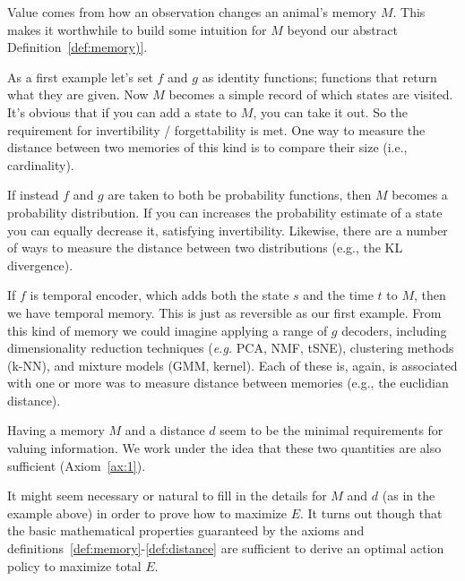 \documentclass[9pt,twocolumn,twoside]{pnas-new}
\begin{document}

Value comes from how an observation changes an animal's memory $M$. This makes it worthwhile to build some intuition for $M$ beyond our abstract Definition~\ref{def:memory)}. 

As a first example let's set $f$ and $g$ as identity functions; functions that return what they are given. Now $M$ becomes a simple record of which states are visited. It's obvious that if you can add a state to $M$, you can take it out. So the requirement for invertibility / forgettability is met. One way to measure the distance between two memories of this kind is to compare their size (i.e., cardinality).

If instead $f$ and $g$ are taken to both be probability functions, then $M$ becomes a probability distribution. If you can increases the probability estimate of a state you can equally decrease it, satisfying invertibility. Likewise, there are a number of ways to measure the distance between two distributions (e.g., the KL divergence).

If $f$ is temporal encoder, which adds both the state $s$ and the time $t$ to $M$, then we have temporal memory. This is just as reversible as our first example. From this kind of memory we could imagine applying a range of $g$ decoders, including dimensionality reduction techniques (\textit{e.g.} PCA, NMF, tSNE), clustering methods (k-NN), and mixture models (GMM, kernel). Each of these is, again, is associated with one or more was to measure distance between memories (e.g., the euclidian distance).

Having a memory $M$ and a distance $d$ seem to be the minimal requirements for valuing information. We work under the idea that these two quantities are also  sufficient (Axiom~\ref{ax:1}).

It might seem necessary or natural to fill in the details for $M$ and $d$ (as in the example above) in order to prove how to maximize $E$. It turns out though that the basic mathematical properties guaranteed by the axioms and definitions~\ref{def:memory}-\ref{def:distance} are sufficient to derive an optimal action policy to maximize total $E$. 
\end{document}
